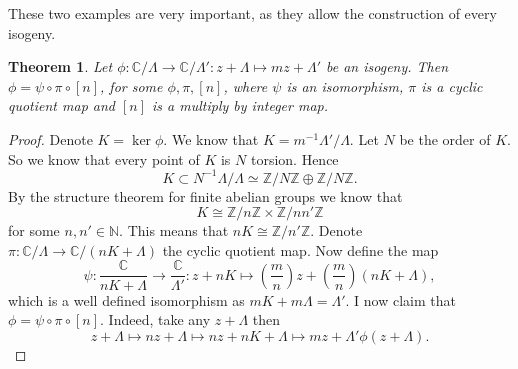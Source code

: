 \documentclass[a4paper]{article}
\theoremstyle{theoremdd}
\newtheorem{theorem}{Theorem}[section]
\theoremstyle{definitiondd}
\theoremstyle{remarkdd}
\newcommand{\N}{\mathbb{N}}
\newcommand{\Z}{\mathbb{Z}}
\newcommand{\C}{\mathbb{C}}
\begin{document}
These two examples are very important, as they allow the construction of every isogeny. 
\begin{theorem}
	Let $\phi: \C / \Lambda \to \C / \Lambda': z + \Lambda \mapsto mz + \Lambda'$ be an isogeny. Then $\phi = \psi \circ \pi \circ [n]$, for some $\phi, \pi, [n]$, where  $\psi$ is an isomorphism, $\pi$ is a cyclic quotient map and $[n]$ is a multiply by integer map.
\end{theorem}
\begin{proof}
	Denote $K = \ker \phi$. We know that $K = m^{-1} \Lambda' / \Lambda$.
	Let $N$ be the order of $K$. So we know that every point of $K$ is $N$ torsion. 
	Hence \[
		K \subset N^{-1} \Lambda / \Lambda \simeq \Z / N \Z \oplus \Z / N \Z. 
	\]
	By the structure theorem for finite abelian groups we know that  \[
	K \cong \Z / n \Z \times \Z / n n' \Z
	\]
	for some $n, n'\in \N$. 
	This means that $nK \cong \Z / n' \Z$. Denote $\pi: \C / \Lambda \to \C / (nK + \Lambda)$ the cyclic quotient map. Now define the map \[
		\psi: \frac{\C}{nK + \Lambda} \to \frac{\C}{\Lambda'}: z + nK \mapsto  \left(\frac{m}{n}\right) z + \left( \frac{m}{n} \right)(nK + \Lambda)
	,\] 
	which is a well defined isomorphism as $mK + m\Lambda = \Lambda'$. 
	I now claim that $\phi = \psi \circ \pi \circ [n]$. Indeed, take any $z + \Lambda$ then \[
		z + \Lambda \mapsto nz + \Lambda \mapsto  nz + nK + \Lambda \mapsto  mz + \Lambda' \phi(z + \Lambda)
	.\]  
\end{proof}

\end{document}
